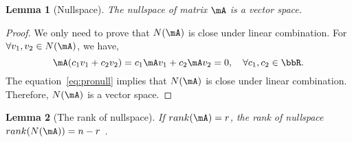 \documentclass[11pt]{article}
\theoremstyle{plain}
\newtheorem{lem}{Lemma}
\theoremstyle{definition}
\begin{document}
\vspace{.2cm}

\begin{lem}[Nullspace] 
The \textit{nullspace} of matrix $\mA$ is a vector space. 
\end{lem}

\begin{proof}
We only need to prove that $N(\mA)$ is close under linear combination. For $\forall v_1, v_2 \in N(\mA)$, we have,
\begin{equation}\label{eq:pronull}
	\mA(c_1 v_1 + c_2 v_2) = c_1 \mA v_1 +  c_2 \mA v_2 = 0, \quad \forall  c_1, c_2 \in \bbR.
\end{equation}
The equation~\eqref{eq:pronull} implies that  $N(\mA)$ is close under linear combination. Therefore, $N(\mA)$ is a vector space. 
\end{proof}

\begin{lem}[The rank of nullspace]\label{lem:ranknull}
If  $rank(\mA) = r$, the rank of nullspace $rank(N(\mA)) = n-r$ .
\end{lem}
\end{document}

